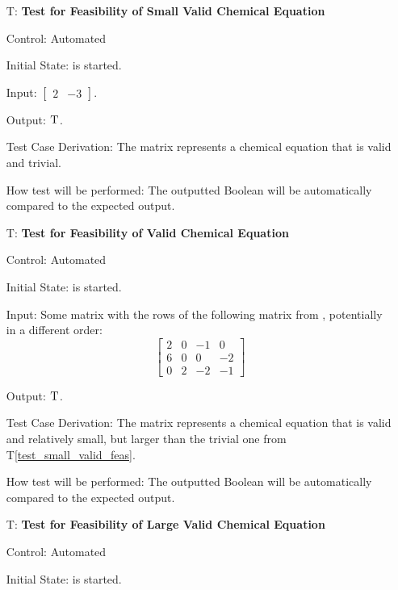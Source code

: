 \documentclass[12pt, titlepage]{article}
\newcounter{testnum} %
\newcommand{\testref}[1]{T\ref{#1}}
\begin{document}
\begin{enumerate}

  \item[T\refstepcounter{testnum}\thetestnum \label{test_small_valid_feas}:]
    \textbf{Test for Feasibility of Small Valid Chemical Equation}

    Control: Automated

    Initial State: \progname{} is started.

    Input: $\begin{bmatrix}
        2 & -3
      \end{bmatrix}$.

    Output: $\textsc{T}$.

    Test Case Derivation: The matrix represents a chemical equation that is
    valid and trivial.

    How test will be performed: The outputted Boolean will be automatically
    compared to the expected output.

  \item[T\refstepcounter{testnum}\thetestnum \label{test_valid_feas}:]
    \textbf{Test for Feasibility of Valid Chemical Equation}

    Control: Automated

    Initial State: \progname{} is started.

    Input: Some matrix with the rows of the following matrix from
    \cite{hamid_balancing_2019}, potentially in a different order:
    $$\begin{bmatrix}
        2 & 0 & -1 & 0  \\
        6 & 0 & 0  & -2 \\
        0 & 2 & -2 & -1
      \end{bmatrix}$$

    Output: $\textsc{T}$.

    Test Case Derivation: The matrix represents a chemical equation that is
    valid and relatively small, but larger than the trivial one from
    \testref{test_small_valid_feas}.

    How test will be performed: The outputted Boolean will be automatically
    compared to the expected output.

  \item[T\refstepcounter{testnum}\thetestnum \label{test_large_valid_feas}:]
    \textbf{Test for Feasibility of Large Valid Chemical Equation}

    Control: Automated

    Initial State: \progname{} is started.


\end{enumerate}
\end{document}
